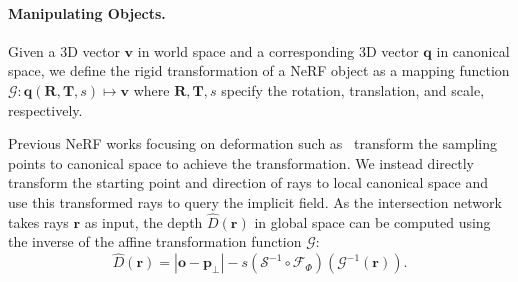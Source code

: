 \documentclass[letterpaper]{article}
\begin{document}
\paragraph{Manipulating Objects.} Given a 3D vector $\mathbf{v}$ in world space and a corresponding 3D vector $\mathbf{q}$ in canonical space, we define the rigid transformation of a NeRF object as
 a mapping function $\mathcal{G}: \mathbf{q}(\mathbf{R}, \mathbf{T}, s) \mapsto \mathbf{v} $ where $\mathbf{R}, \mathbf{T}, s$ specify the rotation, translation, and scale, respectively.

Previous NeRF works focusing on deformation such as~\cite{Pumarola_2021_CVPR, park2021nerfies, park2021hypernerf, ost2021neural} transform the sampling points to canonical space to achieve the transformation. We instead directly transform the starting point and direction of rays to local canonical space and use this transformed rays to query the implicit field.
As the intersection network takes rays $\mathbf{r}$ as input, the depth $\hat{D}(\mathbf{r})$ in global space can be computed using the inverse of the affine transformation function $\mathcal{G}$:
\begin{equation}
    \hat{D}(\mathbf{r}) = |\mathbf{o}-\mathbf{p}_{\perp}|- s\left(\mathcal{S}^{-1} \circ \mathcal{F}_{\Phi}\right) \left(\mathcal{G}^{-1}(\mathbf{r})\right).
\end{equation}
\end{document}
